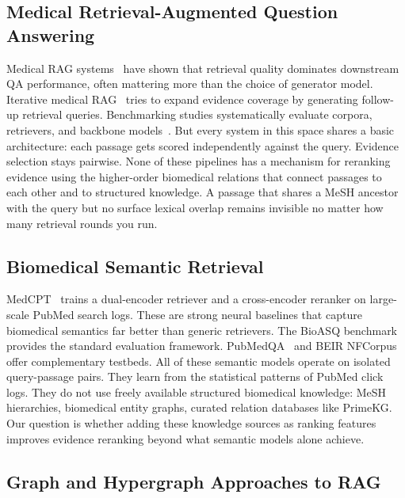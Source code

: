 \subsection{Medical Retrieval-Augmented Question Answering}

Medical RAG systems~\citep{xiong2024benchmarking} have shown that retrieval quality dominates downstream QA performance, often mattering more than the choice of generator model. Iterative medical RAG~\citep{xiong2024imedrag} tries to expand evidence coverage by generating follow-up retrieval queries. Benchmarking studies systematically evaluate corpora, retrievers, and backbone models~\citep{xiong2024benchmarking}. But every system in this space shares a basic architecture: each passage gets scored independently against the query. Evidence selection stays pairwise. None of these pipelines has a mechanism for reranking evidence using the higher-order biomedical relations that connect passages to each other and to structured knowledge. A passage that shares a MeSH ancestor with the query but no surface lexical overlap remains invisible no matter how many retrieval rounds you run.

\subsection{Biomedical Semantic Retrieval}

MedCPT~\citep{jin2023medcpt} trains a dual-encoder retriever and a cross-encoder reranker on large-scale PubMed search logs. These are strong neural baselines that capture biomedical semantics far better than generic retrievers. The BioASQ benchmark~\citep{tsatsaronis2015bioasq,krithara2023bioasqqa} provides the standard evaluation framework. PubMedQA~\citep{jin2019pubmedqa} and BEIR NFCorpus~\citep{thakur2021beir} offer complementary testbeds. All of these semantic models operate on isolated query-passage pairs. They learn from the statistical patterns of PubMed click logs. They do not use freely available structured biomedical knowledge: MeSH hierarchies, biomedical entity graphs, curated relation databases like PrimeKG. Our question is whether adding these knowledge sources as ranking features improves evidence reranking beyond what semantic models alone achieve.

\subsection{Graph and Hypergraph Approaches to RAG}

